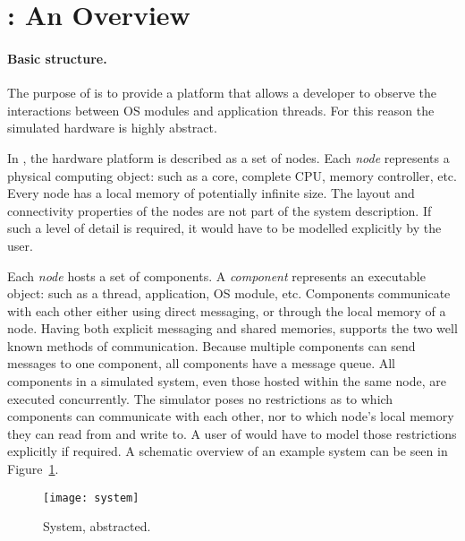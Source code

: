 %

\section{\soosim: An Overview}
\label{sec:soosim-an-overview}

\paragraph{Basic structure.}
The purpose of \soosim is to provide a platform that allows a developer to observe the interactions between OS modules and application threads.
For this reason the simulated hardware is highly abstract.

In \soosim, the hardware platform is described as a set of nodes.
Each \emph{node} represents a physical computing object: such as a core, complete CPU, memory controller, etc.
Every node has a local memory of potentially infinite size.
The layout and connectivity properties of the nodes are not part of the system description.
If such a level of detail is required, it would have to be modelled explicitly by the user.

Each \emph{node} hosts a set of components.
A \emph{component} represents an executable object: such as a thread, application, OS module, etc.
Components communicate with each other either using direct messaging, or through the local memory of a node.
Having both explicit messaging and shared memories, \soosim supports the two well known methods of communication.
Because multiple components can send messages to one component, all components have a message queue.
All components in a simulated system, even those hosted within the same node, are executed concurrently.
The simulator poses no restrictions as to which components can communicate with each other, nor to which node's local memory they can read from and write to.
A user of \soosim would have to model those restrictions explicitly if required.
A schematic overview of an example system can be seen in Figure~\ref{fig:system}.

\begin{figure}
\centering
%
\texttt{[image: system]}
\caption{System, abstracted.}
\label{fig:system}
\end{figure}

